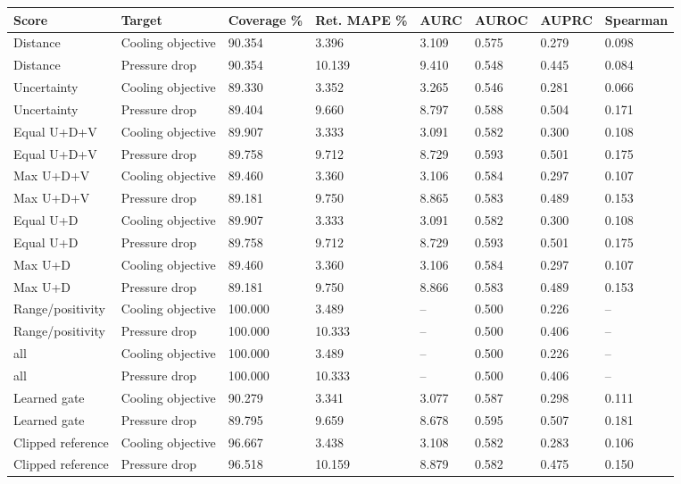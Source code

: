 \begin{table}[htbp]\centering\small\setlength{\tabcolsep}{3pt}\begin{tabular}{llllllll}
\toprule
Score & Target & Coverage \% & Ret. MAPE \% & AURC & AUROC & AUPRC & Spearman\\\midrule
Distance & Cooling objective & 90.354 & 3.396 & 3.109 & 0.575 & 0.279 & 0.098\\
Distance & Pressure drop & 90.354 & 10.139 & 9.410 & 0.548 & 0.445 & 0.084\\
Uncertainty & Cooling objective & 89.330 & 3.352 & 3.265 & 0.546 & 0.281 & 0.066\\
Uncertainty & Pressure drop & 89.404 & 9.660 & 8.797 & 0.588 & 0.504 & 0.171\\
Equal U+D+V & Cooling objective & 89.907 & 3.333 & 3.091 & 0.582 & 0.300 & 0.108\\
Equal U+D+V & Pressure drop & 89.758 & 9.712 & 8.729 & 0.593 & 0.501 & 0.175\\
Max U+D+V & Cooling objective & 89.460 & 3.360 & 3.106 & 0.584 & 0.297 & 0.107\\
Max U+D+V & Pressure drop & 89.181 & 9.750 & 8.865 & 0.583 & 0.489 & 0.153\\
Equal U+D & Cooling objective & 89.907 & 3.333 & 3.091 & 0.582 & 0.300 & 0.108\\
Equal U+D & Pressure drop & 89.758 & 9.712 & 8.729 & 0.593 & 0.501 & 0.175\\
Max U+D & Cooling objective & 89.460 & 3.360 & 3.106 & 0.584 & 0.297 & 0.107\\
Max U+D & Pressure drop & 89.181 & 9.750 & 8.866 & 0.583 & 0.489 & 0.153\\
Range/positivity & Cooling objective & 100.000 & 3.489 & -- & 0.500 & 0.226 & --\\
Range/positivity & Pressure drop & 100.000 & 10.333 & -- & 0.500 & 0.406 & --\\
all & Cooling objective & 100.000 & 3.489 & -- & 0.500 & 0.226 & --\\
all & Pressure drop & 100.000 & 10.333 & -- & 0.500 & 0.406 & --\\
Learned gate & Cooling objective & 90.279 & 3.341 & 3.077 & 0.587 & 0.298 & 0.111\\
Learned gate & Pressure drop & 89.795 & 9.659 & 8.678 & 0.595 & 0.507 & 0.181\\
Clipped reference & Cooling objective & 96.667 & 3.438 & 3.108 & 0.582 & 0.283 & 0.106\\
Clipped reference & Pressure drop & 96.518 & 10.159 & 8.879 & 0.582 & 0.475 & 0.150\\

\end{tabular}
\end{table}

